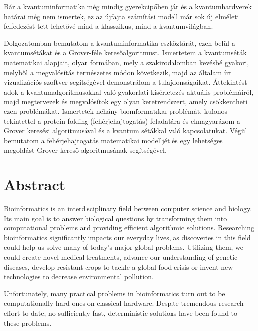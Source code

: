 Bár a kvantuminformatika még mindig gyerekcipőben jár és a kvantumhardverek határai még nem ismertek, ez az újfajta számítási modell már sok új elméleti felfedezést tett lehetővé mind a klasszikus, mind a kvantumvilágban.


Dolgozatomban bemutatom a kvantuminformatika eszköztárát, ezen belül a kvantumsétákat és a Grover-féle keresőalgoritmust. Ismertetem a kvantumséták matematikai alapjait, olyan formában, mely a szakirodalomban kevésbé gyakori, melyből a megvalósítás természetes módon következik, majd az általam írt vizualizációs szoftver segítségével demonstrálom a tulajdonságaikat. Áttekintést adok a kvantumalgoritmusokkal való gyakorlati kísérletezés aktuális problémáiról, majd megtervezek és megvalósítok egy olyan keretrendszert, amely csökkentheti ezen problémákat. Ismertetek néhány bioinformatikai problémát, különös tekintettel a protein folding (fehérjehajtogatás) feladatára és elmagyarázom a Grover keresési algoritmusával és a kvantum sétákkal való kapcsolatukat. Végül bemutatom a fehérjehajtogatás matematikai modelljét és egy lehetséges megoldást Grover kereső algoritmusának segítségével.

\vfill
\selectenglish

\chapter*{Abstract}

Bioinformatics is an interdisciplinary field between computer science and biology. Its main goal is to answer biological questions by transforming them into computational problems and providing efficient algorithmic solutions. Researching bioinformatics significantly impacts our everyday lives, as discoveries in this field could help us solve many of today's major global problems. Utilizing them, we could create novel medical treatments, advance our understanding of genetic diseases, develop resistant crops to tackle a global food crisis or invent new technologies to decrease environmental pollution.

Unfortunately, many practical problems in bioinformatics turn out to be computationally hard ones on classical hardware. Despite tremendous research effort to date, no sufficiently fast, deterministic solutions have been found to these problems.

